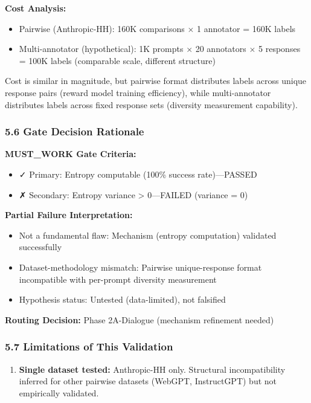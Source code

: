 \textbf{Cost Analysis:}
\begin{itemize}
\item Pairwise (Anthropic-HH): 160K comparisons $\times$ 1 annotator = 160K labels
\item Multi-annotator (hypothetical): 1K prompts $\times$ 20 annotators $\times$ 5 responses = 100K labels (comparable scale, different structure)
\end{itemize}

Cost is similar in magnitude, but pairwise format distributes labels across unique response pairs (reward model training efficiency), while multi-annotator distributes labels across fixed response sets (diversity measurement capability).

\subsubsection{5.6 Gate Decision Rationale}

\textbf{MUST\_WORK Gate Criteria:}
\begin{itemize}
\item ✓ Primary: Entropy computable (100\% success rate)---PASSED
\item ✗ Secondary: Entropy variance > 0---FAILED (variance = 0)
\end{itemize}

\textbf{Partial Failure Interpretation:}
\begin{itemize}
\item Not a fundamental flaw: Mechanism (entropy computation) validated successfully
\item Dataset-methodology mismatch: Pairwise unique-response format incompatible with per-prompt diversity measurement
\item Hypothesis status: Untested (data-limited), not falsified
\end{itemize}

\textbf{Routing Decision:} Phase 2A-Dialogue (mechanism refinement needed)

\subsubsection{5.7 Limitations of This Validation}

\begin{enumerate}
\item \textbf{Single dataset tested:} Anthropic-HH only. Structural incompatibility inferred for other pairwise datasets (WebGPT, InstructGPT) but not empirically validated.
\end{enumerate}

